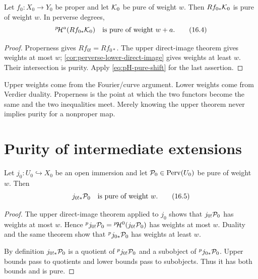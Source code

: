 \begin{theorem}
\label{thm:proper-direct-image-purity}
Let \(f_0:X_0\to Y_0\) be proper and let \(\mathcal K_0\) be pure of weight \(w\).
Then \(Rf_{0*}\mathcal K_0\) is pure of weight \(w\).  In perverse degrees,
\[
  {}^{p}\!\mathcal H^a(Rf_{0*}\mathcal K_0)
  \quad\text{is pure of weight }w+a.
\tag{16.4}\label{eq:proper-perverse-purity}
\]
\end{theorem}

\begin{proof}
Properness gives \(Rf_{0!}=Rf_{0*}\).  The upper direct-image theorem gives
weights at most \(w\); \cref{cor:perverse-lower-direct-image} gives weights at
least \(w\).  Their intersection is purity.  Apply
\eqref{eq:pH-pure-shift} for the last assertion.
\end{proof}

\begin{perversebox}
Upper weights come from the Fourier/curve argument.  Lower weights come from
Verdier duality.  Properness is the point at which the two functors become the
same and the two inequalities meet.  Merely knowing the upper theorem never
implies purity for a nonproper map.
\end{perversebox}

\section{Purity of intermediate extensions}

\begin{theorem}
\label{thm:jmiddle-purity}
Let \(j_0:U_0\hookrightarrow X_0\) be an open immersion and let
\(\mathcal P_0\in\operatorname{Perv}(U_0)\) be pure of weight \(w\).  Then
\[
  j_{0!*}\mathcal P_0
  \quad\text{is pure of weight }w.
\tag{16.5}\label{eq:jmiddle-pure}
\]
\end{theorem}

\begin{proof}
The upper direct-image theorem applied to \(j_0\) shows that
\(j_{0!}\mathcal P_0\) has weights at most \(w\).  Hence
\({}^pj_{0!}\mathcal P_0={}^{p}\!\mathcal H^0(j_{0!}\mathcal P_0)\) has weights at most \(w\).
Duality and the same theorem show that
\({}^pj_{0*}\mathcal P_0\) has weights at least \(w\).

By definition \(j_{0!*}\mathcal P_0\) is a quotient of
\({}^pj_{0!}\mathcal P_0\) and a subobject of
\({}^pj_{0*}\mathcal P_0\).  Upper bounds pass to quotients and lower bounds pass to
subobjects.  Thus it has both bounds and is pure.
\end{proof}

